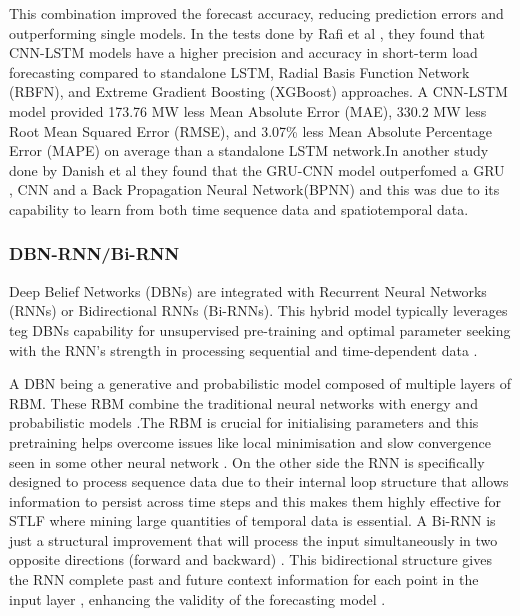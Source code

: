   This combination improved the forecast accuracy, reducing prediction errors and outperforming single models. In the tests done by  Rafi et al \cite{rafi2021short} , they found that CNN-LSTM models have a higher precision and accuracy in short-term load forecasting compared to standalone LSTM, Radial Basis Function Network (RBFN), and Extreme Gradient Boosting (XGBoost) approaches. A CNN-LSTM model provided 173.76 MW less Mean Absolute Error (MAE), 330.2 MW less Root Mean Squared Error (RMSE), and 3.07\% less Mean Absolute Percentage Error (MAPE) on average than a standalone LSTM network.In another study done by Danish et al \cite{danish2025kolmogorov} they found that the GRU-CNN model outperfomed a GRU , CNN and a Back Propagation Neural Network(BPNN) and this was due to its capability to learn from both time sequence data and spatiotemporal data.
  

 \subsubsection{DBN-RNN/Bi-RNN}
 Deep Belief Networks (DBNs) are integrated with Recurrent Neural Networks (RNNs) or Bidirectional RNNs (Bi-RNNs). This hybrid model typically leverages teg  DBNs capability for unsupervised pre-training and optimal parameter seeking with the RNN's strength in processing sequential and time-dependent data \cite{tang2019application}.
 
 A DBN being a generative and probabilistic model composed of multiple layers of RBM. These RBM combine the traditional neural networks with energy and probabilistic models  \cite{dong2021short}.The RBM is crucial for initialising parameters and this pretraining helps overcome issues like local minimisation and slow convergence seen in some other neural network \cite{gao2021cooling}. On the other side the RNN is specifically designed to process sequence data due to their internal loop structure that allows information to persist across time steps \cite{wang2018short} and this makes them highly effective for STLF where mining large quantities of temporal data is essential. A Bi-RNN is just a structural improvement that will process the input simultaneously in two opposite directions (forward and backward) \cite{tang2019application} . This bidirectional structure gives the RNN complete past and future context information for each point in the input layer  , enhancing the validity of the forecasting model \cite{tang2019application}.
 
